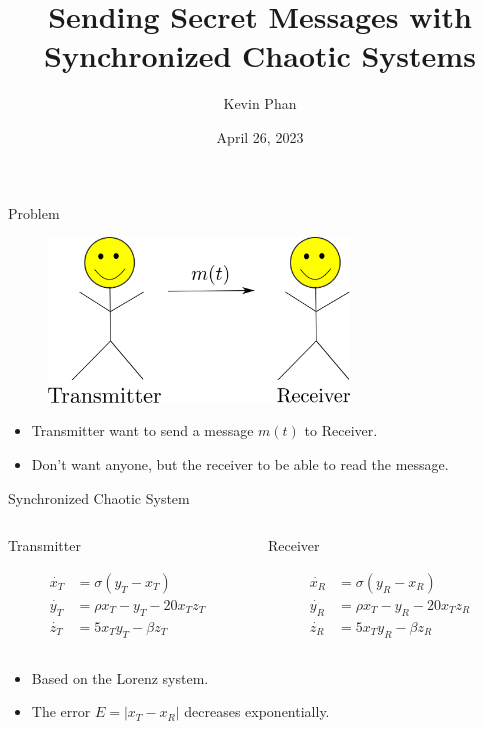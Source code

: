 \documentclass{beamer}
\title[Synchronized Chaos]{Sending Secret Messages with Synchronized
Chaotic Systems}
\author{Kevin Phan}
\institute{Harvey Mudd College}
\date{April 26, 2023}
\begin{document}
\frame{\titlepage}

\begin{frame}{Problem}
    \begin{figure}[H]
        \includegraphics[width=8cm]{drawing.png}
        \centering
    \end{figure}
    \begin{itemize}
        \item Transmitter want to send a message $m(t)$ to Receiver. 
        \item Don't want anyone, but the receiver to be able to read the message.
    \end{itemize}
\end{frame}

\begin{frame}{Synchronized Chaotic System}
    \begin{columns}
        \begin{column}{0.5\textwidth}
           \begin{center}
            Transmitter 
           \end{center} 
           \begin{align*}
                \dot{x_T} &= \sigma (y_T - x_T) \\
                \dot{y_T} &= \rho x_T - y_T - 20x_T z_T \\
                \dot{z_T} &= 5x_T y_T - \beta z_T 
           \end{align*}
        \end{column}
        \begin{column}{0.5\textwidth}  
            \begin{center}
                Receiver 
            \end{center} 
            \begin{align*}
                \dot{x_R} &= \sigma (y_R - x_R) \\
                \dot{y_R} &= \rho x_T - y_R - 20x_T z_R \\
                \dot{z_R} &= 5x_T y_R - \beta z_R
            \end{align*}
        \end{column}
        \end{columns} 
         \bigskip
        \begin{itemize}
            \item Based on the Lorenz system. 
            \item The error $E = |x_T - x_R|$ decreases exponentially. 
        \end{itemize}
\end{frame}
\end{document}
